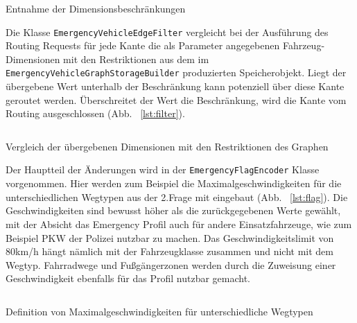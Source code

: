 \begin{listing}[htb]
\centering
{}
\inputminted[gobble=7, fontsize=\footnotesize, breaklines=true, breakbytoken=|, firstline=143, lastline=158]{java}{../data/JavaFiles/EmergencyVehicleGraphStorageBuilder.java}
\caption{Entnahme der Dimensionsbeschränkungen}
\label{lst:builder}
\end{listing}

Die Klasse \texttt{EmergencyVehicleEdgeFilter} vergleicht bei der Ausführung des Routing Requests für jede Kante die als Parameter angegebenen Fahrzeug-Dimensionen mit den Restriktionen aus dem im \texttt{EmergencyVehicleGraphStorageBuilder} produzierten Speicherobjekt.
Liegt der übergebene Wert unterhalb der Beschränkung kann potenziell über diese Kante geroutet werden.
Überschreitet der Wert die Beschränkung, wird die Kante vom Routing ausgeschlossen (Abb. ~\ref{lst:filter}).

\begin{listing}[htb]
\centering
{}
\inputminted[gobble=5, fontsize=\footnotesize, breaklines=true, breakbytoken=|, firstline=102, lastline=107]{java}{../data/JavaFiles/EmergencyVehicleEdgeFilter.java}
\caption{Vergleich der übergebenen Dimensionen mit den Restriktionen des Graphen}
\label{lst:filter}
\end{listing}

Der Hauptteil der Änderungen wird in der \texttt{EmergencyFlagEncoder} Klasse vorgenommen.
Hier werden zum Beispiel die Maximalgeschwindigkeiten für die unterschiedlichen Wegtypen aus der 2.Frage mit eingebaut (Abb. ~\ref{lst:flag}).
Die Geschwindigkeiten sind bewusst höher als die zurückgegebenen Werte gewählt, mit der Absicht das Emergency Profil auch für andere Einsatzfahrzeuge, wie zum Beispiel PKW der Polizei nutzbar zu machen.
Das Geschwindigkeitslimit von 80km/h hängt nämlich mit der Fahrzeugklasse zusammen und nicht mit dem Wegtyp.
Fahrradwege und Fußgängerzonen werden durch die Zuweisung einer Geschwindigkeit ebenfalls für das Profil nutzbar gemacht.

\begin{listing}[htb]
\centering
{}
\inputminted[gobble=8, fontsize=\footnotesize, breaklines=true, breakbytoken=|, firstline=149, lastline=179]{java}{../data/JavaFiles/EmergencyFlagEncoder.java}
\caption{Definition von Maximalgeschwindigkeiten für unterschiedliche Wegtypen}
\label{lst:flag}
\end{listing}

